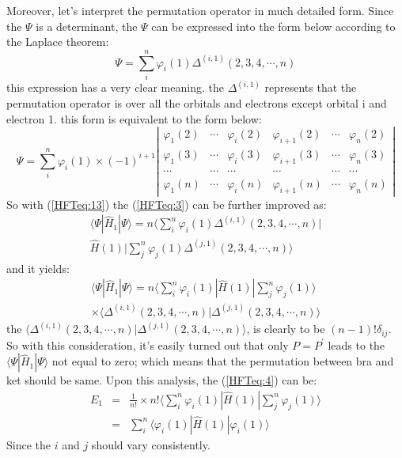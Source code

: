 Moreover, let's interpret the permutation operator in much detailed
form. Since the $\Psi$ is a determinant, the $\Psi$ can be expressed
into the form below according to the Laplace theorem:
\begin{equation}\label{HFTeq:13}
\Psi = \sum^{n}_{i}\varphi_{i}(1)\Delta^{(i,1)}(2,3,4,\cdots,n)
\end{equation}
this expression has a very clear meaning. the $\Delta^{(i,1)}$
represents that the permutation operator is over all the orbitals
and electrons except orbital i and electron 1. this form is
equivalent to the form below:
\begin{equation}
\Psi = \sum^{n}_{i}\varphi_{i}(1) \times (-1)^{i+1} \left |
\begin{array}{cccccc}
  \varphi_{1}(2) & \cdots & \varphi_{i}(2) & \varphi_{i+1}(2) & \cdots & \varphi_{n}(2) \\
  \varphi_{1}(3) & \cdots & \varphi_{i}(3) & \varphi_{i+1}(3) & \cdots & \varphi_{n}(3) \\
  \cdots         & \cdots & \cdots         & \cdots           & \cdots & \cdots         \\
  \varphi_{1}(n) & \cdots & \varphi_{i}(n) & \varphi_{i+1}(n) & \cdots & \varphi_{n}(n)
\end{array}
\right |
\end{equation}
So with (\ref{HFTeq:13}) the (\ref{HFTeq:3}) can be further improved
as:
\begin{multline}\label{}
 \langle\Psi|\hat{H}_{1}|\Psi\rangle =n  \langle
\sum^{n}_{i}\varphi_{i}(1)\Delta^{(i,1)}(2,3,4,\cdots,n) |\\
\hat{H}(1)| \sum^{n}_{j}\varphi_{j}(1)\Delta^{(j,1)}(2,3,4,\cdots,n)
 \rangle
\end{multline}
and it yields:
\begin{multline}\label{HFTeq:14}
\langle\Psi|\hat{H}_{1}|\Psi\rangle = n \langle
\sum^{n}_{i}\varphi_{i}(1)|\hat{H}(1)|
\sum^{n}_{j}\varphi_{j}(1)  \rangle \\
\times \langle \Delta^{(i,1)}(2,3,4,\cdots,n)
|\Delta^{(j,1)}(2,3,4,\cdots,n)
 \rangle
\end{multline}
the $\langle \Delta^{(i,1)}(2,3,4,\cdots,n)
|\Delta^{(j,1)}(2,3,4,\cdots,n)
 \rangle$, is clearly to be $(n-1)!\delta_{ij}$. So with this consideration, it's easily
turned out that only $P=P^{'}$ leads to the
$\langle\Psi|\hat{H}_{1}|\Psi\rangle$ not equal to zero; which means
that the permutation between bra and ket should be same. Upon this
analysis, the (\ref{HFTeq:4}) can be:
\begin{eqnarray}
  E_{1} &=& \frac{1}{n!}\times n! \langle
\sum^{n}_{i}\varphi_{i}(1)|\hat{H}(1)| \sum^{n}_{j}\varphi_{j}(1)
\rangle \nonumber  \\
   &=&
\sum^{n}_{i}\langle\varphi_{i}(1)|\hat{H}(1)|\varphi_{i}(1) \rangle
\end{eqnarray}
Since the $i$ and $j$ should vary consistently.


